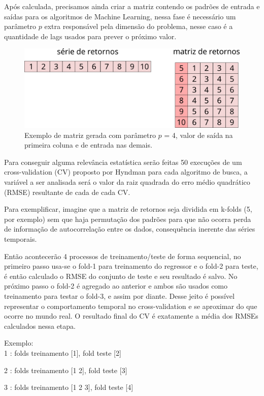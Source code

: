 \documentclass[preprint,12pt]{elsarticle}
\begin{document}
Após calculada, precisamos ainda criar a matriz contendo os padrões de entrada e saídas para os algoritmos de Machine Learning, nessa fase é necessário um parâmetro $p$ extra responsável pela dimensão do problema, nesse caso é a quantidade de lags usados para prever o próximo valor.


\begin{figure}[h]
	\centering\includegraphics[width=0.8\linewidth]{g4145}
	\caption{Exemplo de matriz gerada com parâmetro $p$ = 4, valor de saída na primeira coluna e de entrada nas demais.}
\end{figure}


Para conseguir alguma relevância estatística serão feitas 50 execuções de um cross-validation (CV) proposto por Hyndman \cite{hyndman} para cada algoritmo de busca, a variável a ser analisada será o valor da raiz quadrada do erro médio quadrático (RMSE) resultante de cada  de cada CV.

Para exemplificar, imagine que a matriz de retornos seja dividida em k-folds (5, por exemplo) sem que haja permutação dos padrões para que não ocorra perda de informação de autocorrelação entre os dados, consequência inerente das séries temporais. 

Então acontecerão 4 processos de treinamento/teste de forma sequencial, no primeiro passo usa-se o fold-1 para treinamento do regressor e o fold-2 para teste, é então calculado o RMSE do conjunto de teste e seu resultado é salvo. No próximo passo o fold-2 é agregado ao anterior e ambos são usados como treinamento para testar o fold-3, e assim por diante. Desse jeito é possível representar o comportamento temporal no cross-validation e se aproximar do que ocorre no mundo real. O resultado final do CV é exatamente a média dos RMSEs calculados nessa etapa.

Exemplo:\\

1 : folds treinamento [1], fold teste [2]

2 : folds treinamento [1 2], fold teste [3] 

3 : folds treinamento [1 2 3], fold teste [4] 
\end{document}
